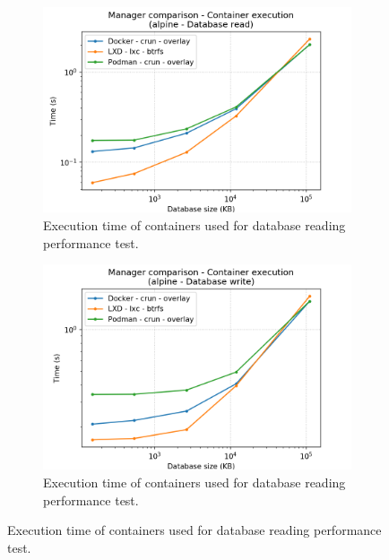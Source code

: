 \begin{figure}[h!]
    \begin{subfigure}{.5\textwidth}
      \centering
      \includegraphics[width=\linewidth]{images/manager/manager-execution-alpine---Database-read.png}
      \caption{Execution time of containers used for database reading performance test.}
      \label{fig:manager:db-read-exec}
    \end{subfigure}
    \begin{subfigure}{.5\textwidth}
      \centering
      \includegraphics[width=\linewidth]{images/manager/manager-execution-alpine---Database-write.png}
      \caption{Execution time of containers used for database reading performance test.}
      \label{fig:manager:db-write-exec}
    \end{subfigure}
    

\end{figure}
